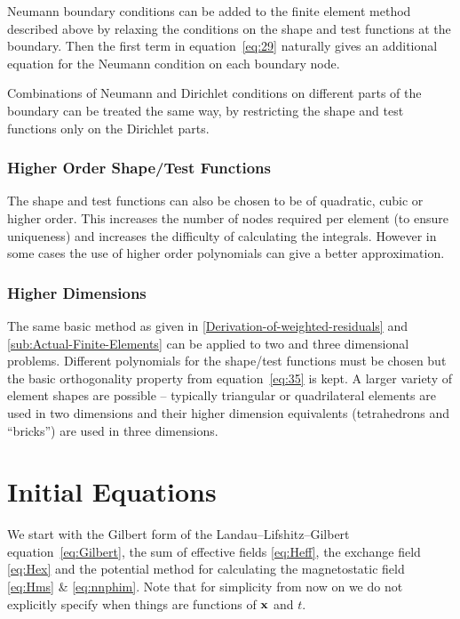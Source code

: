 Neumann boundary conditions can be added to the finite element method described
above by relaxing the conditions on the shape and test functions at the
boundary. Then the first term in equation~\eqref{eq:29} naturally gives an
additional equation for the Neumann condition on each boundary node.

Combinations of Neumann and Dirichlet conditions on different parts of the boundary can be treated the same way, by restricting the shape and test functions only on the Dirichlet parts.


\subsubsection{Higher Order Shape/Test Functions}
\label{sec:fem-high-order-shap}

The shape and test functions can also be chosen to be of quadratic, cubic or higher order. This increases the number of nodes required per element (to ensure uniqueness) and increases the difficulty of calculating the integrals. However in some cases the use of higher order polynomials can give a better approximation.


\subsubsection{Higher Dimensions}
\label{sec:fem-higher-dimensions}

The same basic method as given in \autoref{Derivation-of-weighted-residuals} and \autoref{sub:Actual-Finite-Elements} can be applied to two and three dimensional problems. Different polynomials for the shape/test functions must be chosen but the basic orthogonality property from equation~\eqref{eq:35} is kept. A larger variety of element shapes are possible -- typically triangular or quadrilateral elements are used in two dimensions and their higher dimension equivalents (tetrahedrons and ``bricks'') are used in three dimensions.



\section{Initial Equations}
\label{sec:llg-initial-equations}

We start with the Gilbert form of the Landau--Lifshitz--Gilbert equation~\eqref{eq:Gilbert}, the sum of effective fields \eqref{eq:Heff}, the exchange field \eqref{eq:Hex} and the potential method for calculating the magnetostatic field \eqref{eq:Hms} \& \eqref{eq:nnphim}. Note that for simplicity from now on we do not explicitly specify when things are functions of $\mathbf{x}$ and $t$.

